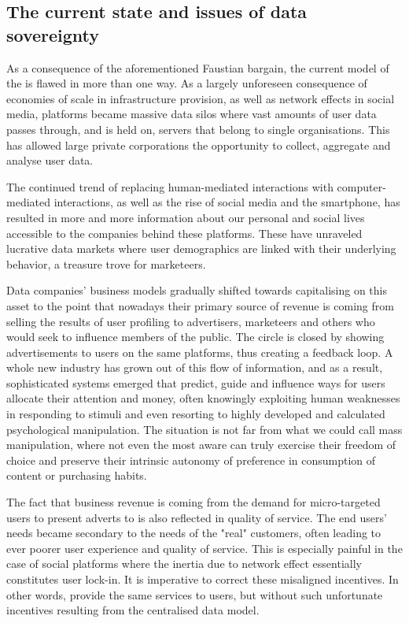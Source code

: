 \subsection{The current state and issues of data sovereignty \statusgreen }\label{sec:data-sovereignty}

As a consequence of the aforementioned Faustian bargain, the current model of the  is flawed in more than one way. As a largely unforeseen consequence of economies of scale in infrastructure provision, as well as network effects in social media, platforms became massive data silos where vast amounts of user data passes through, and is held on, servers that belong to single organisations. This has allowed large private corporations the opportunity to collect, aggregate and analyse user data. 

The continued trend of replacing human-mediated interactions with computer-mediated interactions, as well as the rise of social media and the smartphone, has resulted in more and more information about our personal and social lives accessible to the companies behind these platforms. These have unraveled lucrative data markets where user demographics are linked with their underlying behavior, a treasure trove for marketeers.

Data companies' business models gradually shifted towards capitalising on this asset to the point that nowadays their primary source of revenue is coming from selling the results of user profiling to advertisers, marketeers and others who would seek to influence members of the public. The circle is closed by showing advertisements to users on the same platforms, thus creating a feedback loop. A whole new industry has grown out of this flow of information, and as a result, sophisticated systems emerged that predict, guide and influence ways for users allocate their attention and money, often knowingly exploiting human weaknesses in responding to stimuli and even resorting to highly developed and calculated psychological manipulation. The situation is not far from what we could call mass manipulation, where not even the most aware can truly exercise their freedom of choice and preserve their intrinsic autonomy of preference in consumption of content or purchasing habits.

The fact that business revenue is coming from the demand for micro-targeted users to present adverts to is also reflected in quality of service. The end users' needs became secondary to the needs of the "real" customers, often leading to ever poorer user experience and quality of service. This is especially painful in the case of social platforms where the inertia due to network effect essentially constitutes user lock-in. It is imperative to correct these misaligned incentives. In other words, provide the same services to users, but without such unfortunate incentives resulting from the centralised data model.

